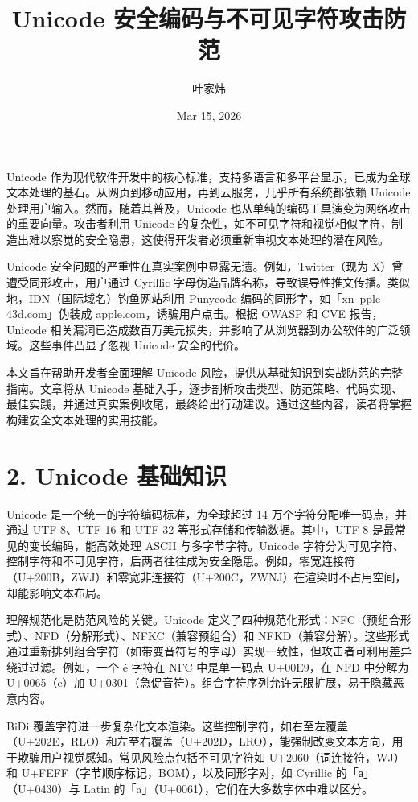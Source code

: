 \title{Unicode 安全编码与不可见字符攻击防范}
\author{叶家炜}
\date{Mar 15, 2026}
\maketitle
Unicode 作为现代软件开发中的核心标准，支持多语言和多平台显示，已成为全球文本处理的基石。从网页到移动应用，再到云服务，几乎所有系统都依赖 Unicode 处理用户输入。然而，随着其普及，Unicode 也从单纯的编码工具演变为网络攻击的重要向量。攻击者利用 Unicode 的复杂性，如不可见字符和视觉相似字符，制造出难以察觉的安全隐患，这使得开发者必须重新审视文本处理的潜在风险。\par
Unicode 安全问题的严重性在真实案例中显露无遗。例如，Twitter（现为 X）曾遭受同形攻击，用户通过 Cyrillic 字母伪造品牌名称，导致误导性推文传播。类似地，IDN（国际域名）钓鱼网站利用 Punycode 编码的同形字，如「xn--pple-43d.com」伪装成 apple.com，诱骗用户点击。根据 OWASP 和 CVE 报告，Unicode 相关漏洞已造成数百万美元损失，并影响了从浏览器到办公软件的广泛领域。这些事件凸显了忽视 Unicode 安全的代价。\par
本文旨在帮助开发者全面理解 Unicode 风险，提供从基础知识到实战防范的完整指南。文章将从 Unicode 基础入手，逐步剖析攻击类型、防范策略、代码实现、最佳实践，并通过真实案例收尾，最终给出行动建议。通过这些内容，读者将掌握构建安全文本处理的实用技能。\par
\chapter{2. Unicode 基础知识}
Unicode 是一个统一的字符编码标准，为全球超过 14 万个字符分配唯一码点，并通过 UTF-8、UTF-16 和 UTF-32 等形式存储和传输数据。其中，UTF-8 是最常见的变长编码，能高效处理 ASCII 与多字节字符。Unicode 字符分为可见字符、控制字符和不可见字符，后两者往往成为安全隐患。例如，零宽连接符（U+200B，ZWJ）和零宽非连接符（U+200C，ZWNJ）在渲染时不占用空间，却能影响文本布局。\par
理解规范化是防范风险的关键。Unicode 定义了四种规范化形式：NFC（预组合形式）、NFD（分解形式）、NFKC（兼容预组合）和 NFKD（兼容分解）。这些形式通过重新排列组合字符（如带变音符号的字母）实现一致性，但攻击者可利用差异绕过过滤。例如，一个 é 字符在 NFC 中是单一码点 U+00E9，在 NFD 中分解为 U+0065（e）加 U+0301（急促音符）。组合字符序列允许无限扩展，易于隐藏恶意内容。\par
BiDi 覆盖字符进一步复杂化文本渲染。这些控制字符，如右至左覆盖（U+202E，RLO）和左至右覆盖（U+202D，LRO），能强制改变文本方向，用于欺骗用户视觉感知。常见风险点包括不可见字符如 U+2060（词连接符，WJ）和 U+FEFF（字节顺序标记，BOM），以及同形字对，如 Cyrillic 的「а」（U+0430）与 Latin 的「a」（U+0061），它们在大多数字体中难以区分。\par
